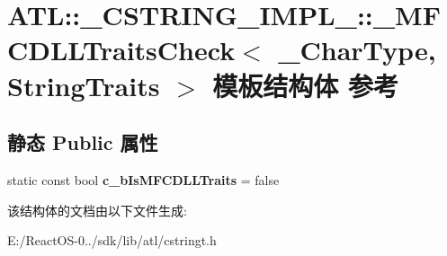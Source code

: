 \hypertarget{struct_a_t_l_1_1___c_s_t_r_i_n_g___i_m_p_l___1_1___m_f_c_d_l_l_traits_check}{}\section{A\+TL\+:\+:\+\_\+\+C\+S\+T\+R\+I\+N\+G\+\_\+\+I\+M\+P\+L\+\_\+\+:\+:\+\_\+\+M\+F\+C\+D\+L\+L\+Traits\+Check$<$ \+\_\+\+Char\+Type, String\+Traits $>$ 模板结构体 参考}
\label{struct_a_t_l_1_1___c_s_t_r_i_n_g___i_m_p_l___1_1___m_f_c_d_l_l_traits_check}
\subsection*{静态 Public 属性}
\begin{DoxyCompactItemize}
\item 
\mbox{\label{struct_a_t_l_1_1___c_s_t_r_i_n_g___i_m_p_l___1_1___m_f_c_d_l_l_traits_check_a8a1666d6c7365e2ecc5c0ed4afaba7b7}} 
static const bool {\bfseries c\+\_\+b\+Is\+M\+F\+C\+D\+L\+L\+Traits} = false
\end{DoxyCompactItemize}


该结构体的文档由以下文件生成\+:\begin{DoxyCompactItemize}
\item 
E\+:/\+React\+O\+S-\/0../sdk/lib/atl/cstringt.\+h\end{DoxyCompactItemize}

